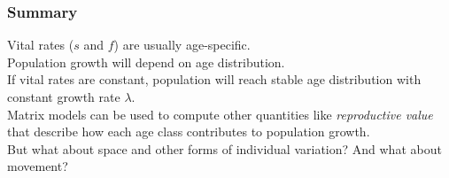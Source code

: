 \documentclass[color=usenames,dvipsnames]{beamer}\usepackage[]{graphicx}\usepackage[]{color}
\begin{document}















\begin{frame}
  \frametitle{Summary}
  Vital rates ($s$ and $f$) are usually age-specific. \\
  \pause
  \vfill
  Population growth will depend on age distribution. \\
  \pause
  \vfill
  If vital rates are constant, population will reach stable
  age distribution with constant growth rate $\lambda$. \\
  \pause
  \vfill
  Matrix models can be used to compute other quantities like
  \emph{reproductive value} that describe how each age class
  contributes to population growth. \\
  \pause
  \vfill
  But what about space and other forms of individual variation? And
  what about movement?
\end{frame}



    
    
\end{document}
